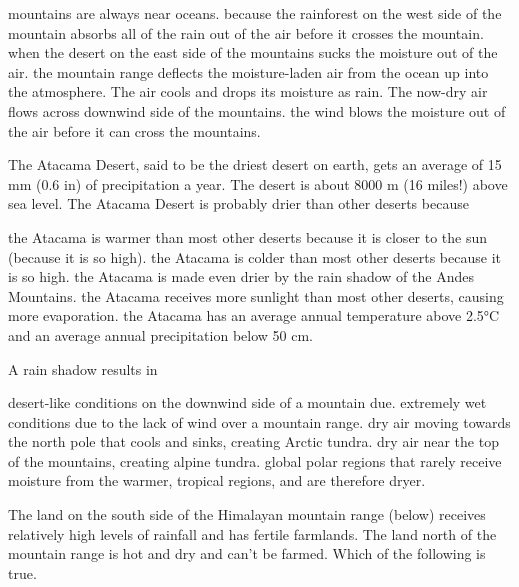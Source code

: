 \begin{choices}
\choice mountains are always near oceans.%
\choice because the rainforest on the west side of the mountain absorbs all of the rain out of the air before it crosses the mountain.%
\choice when the desert on the east side of the mountains sucks the moisture out of the air.%
\correctchoice the mountain range deflects the moisture-laden air from the ocean up into the atmosphere. The air cools and drops its moisture as rain. The now-dry air flows across downwind side of the mountains.%
\choice the wind blows the moisture out of the air before it can cross the mountains.%
\end{choices}



\question
The Atacama Desert, said to be the driest desert on earth, gets an average of 15 mm (0.6 in) of precipitation a year.  The desert is about 8000 m (16 miles!) above sea level. The Atacama Desert is probably drier than other deserts because

\begin{choices}
\choice the Atacama is warmer than most other deserts because it is closer to the sun (because it is so high). %
\choice the Atacama is colder than most other deserts because it is so high. %
\correctchoice the Atacama is made even drier by the rain shadow of the Andes Mountains. %
\choice the Atacama receives more sunlight than most other deserts, causing more evaporation. %
\choice the Atacama has an average annual temperature above 2.5°C and an average annual precipitation below 50 cm. %
\end{choices}

\question
A rain shadow results in 

\begin{choices}
\correctchoice desert-like conditions on the downwind side of a mountain due. %
\choice extremely wet conditions due to the lack of wind over a mountain range. %
\choice dry air moving towards the north pole that cools and sinks, creating Arctic tundra. %
\choice dry air near the top of the mountains, creating alpine tundra. %
\choice global polar regions that rarely receive moisture from the warmer, tropical regions, and are therefore dryer. %
\end{choices}

\question
The land on the south side of the Himalayan mountain range (below) receives relatively high levels of rainfall and has fertile farmlands.  The land north of the mountain range is hot and dry and can't be farmed.  Which of the following is true.

